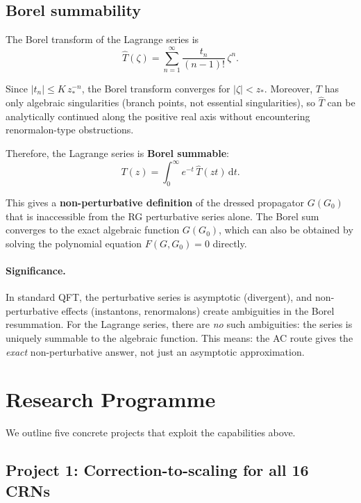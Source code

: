 \documentclass[11pt,a4paper]{article}
\theoremstyle{definition}
\newcommand{\dd}{\mathrm{d}}
\begin{document}
\subsection{Borel summability}

The Borel transform of the Lagrange series is
\begin{equation}
\hat{T}(\zeta) = \sum_{n=1}^{\infty} \frac{t_n}{(n-1)!}\,\zeta^n.
\end{equation}

Since $|t_n| \leq K\,z_*^{-n}$, the Borel transform converges for
$|\zeta| < z_*$. Moreover, $T$ has only algebraic singularities
(branch points, not essential singularities), so $\hat{T}$ can be
analytically continued along the positive real axis without
encountering renormalon-type obstructions.

Therefore, the Lagrange series is \textbf{Borel summable}:
\begin{equation}
T(z) = \int_0^{\infty} e^{-t}\,\hat{T}(zt)\,\dd t.
\end{equation}

This gives a \textbf{non-perturbative definition} of the dressed
propagator $G(G_0)$ that is inaccessible from the RG perturbative
series alone. The Borel sum converges to the exact algebraic function
$G(G_0)$, which can also be obtained by solving the polynomial
equation $F(G, G_0) = 0$ directly.

\paragraph{Significance.}
In standard QFT, the perturbative series is asymptotic (divergent),
and non-perturbative effects (instantons, renormalons) create
ambiguities in the Borel resummation. For the Lagrange series, there
are \emph{no} such ambiguities: the series is uniquely summable to the
algebraic function. This means: the AC route gives the \emph{exact}
non-perturbative answer, not just an asymptotic approximation.


\section{Research Programme}
\label{sec:programme}

We outline five concrete projects that exploit the capabilities above.

\subsection{Project 1: Correction-to-scaling for all 16 CRNs}
\end{document}
